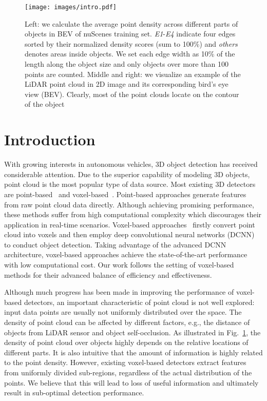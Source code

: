 \documentclass[runningheads]{llncs}
\begin{document}
\begin{figure}[t]
\centering
  \texttt{[image: images/intro.pdf]}
  \\
  \caption{Left: we calculate the average point density across different parts of objects in BEV of nuScenes training set. \emph{E1}-\emph{E4} indicate four edges sorted by their normalized density scores (sum to 100\%) and \emph{others} denotes areas inside objects. We set each edge width as 10\% of the length along the object size and only objects over more than 100 points are counted. Middle and right: we visualize an example of the LiDAR point cloud in 2D image and its corresponding  bird's eye view (BEV). Clearly, most of the point clouds locate on the contour of the object}
\label{fig:intro}
\end{figure}

\section{Introduction}
With growing interests in autonomous vehicles, 3D object detection has received considerable attention. Due to the superior capability of modeling 3D objects, point cloud is the most popular type of data source. Most existing 3D detectors are point-based~\cite{qi2018frustum,wang2019frustum,Lan_2019_CVPR,shi2019pointrcnn,yang2019std} and voxel-based~\cite{lang2019PointPillars,zhou2018voxelnet,yan2018second,ye2020sarpnet,hu2019you}. Point-based approaches generate features from raw point cloud data directly. Although achieving promising performance, these methods suffer from high computational complexity which discourages their application in real-time scenarios. Voxel-based approaches~\cite{lang2019PointPillars,zhou2018voxelnet,yan2018second,ye2020sarpnet,hu2019you} firstly convert point cloud into voxels and then employ deep convolutional neural networks (DCNN) to conduct object detection. Taking advantage of the advanced DCNN architecture, voxel-based approaches achieve the state-of-the-art performance with low computational cost. Our work follows the setting of voxel-based methods for their advanced balance of efficiency and effectiveness.

Although much progress has been made in improving the performance of voxel-based detectors, an important characteristic of point cloud is not well explored: input data points are usually not uniformly distributed over the space. The density of point cloud can be affected by different factors, e.g., the distance of objects from LiDAR sensor and object self-occlusion. As illustrated in Fig.~\ref{fig:intro}, the density of point cloud over objects highly depends on the relative locations of different parts. It is also intuitive that the amount of information is highly related to the point density. However, existing voxel-based detectors extract features from uniformly divided sub-regions, regardless of the actual distribution of the points. We believe that this will lead to loss of useful information and ultimately result in sub-optimal detection performance. 
\end{document}
